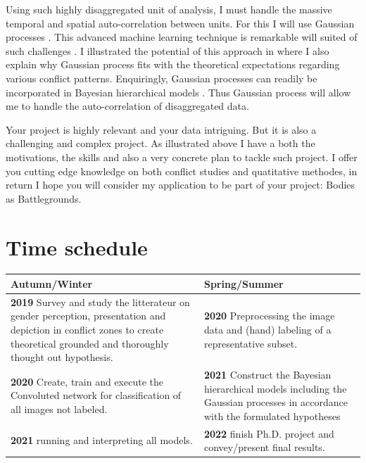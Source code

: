 \documentclass[a4paper]{article}
\begin{document}
Using such highly disaggregated unit of analysis, I must handle the massive temporal and spatial auto-correlation between units. For this I will use Gaussian processes \citep{williams2006gaussian}. This advanced machine learning technique is remarkable will suited of such challenges \citep{Gelman_2013, gelfand2016spatial, Mcelreath_2018, SPECIALE}. I illustrated the potential of this approach in \cite{SPECIALE} where I also explain why Gaussian process fits with the theoretical expectations regarding various conflict patterns\citep[22-27]{SPECIALE}. Enquiringly, Gaussian processes can readily be incorporated in Bayesian hierarchical models \citep[410-419]{Mcelreath_2018}. Thus Gaussian process will allow me to handle the auto-correlation of disaggregated data.\par


Your project is highly relevant and your data intriguing. But it is also a challenging and complex project. As illustrated above I have a both the motivations, the skills and also a very concrete plan to tackle such project. I offer you cutting edge knowledge on both conflict studies and quatitative methodes, in return I hope you will consider my application to be part of your project: Bodies as Battlegrounds.\par



\pagebreak

\section{Time schedule} 

\begin{center}
\begin{tabular}{ m{7.5cm}| m{7.5cm} } 
    \textbf{Autumn/Winter}              & \textbf{Spring/Summer}\\
	\hline
    \textbf{2019} Survey and study the litterateur on gender perception, presentation and depiction in conflict zones to create theoretical grounded and thoroughly thought out hypothesis.
    & \textbf{2020} Preprocessing the image data and (hand) labeling of a representative subset.\\
    
    \hline
    \textbf{2020} Create, train and execute the Convoluted network for classification of all images not labeled.
    & \textbf{2021} Construct the Bayesian hierarchical models including the Gaussian processes in accordance with the formulated hypotheses\\
    
    \hline
    \textbf{2021} running and interpreting all models.
    & \textbf{2022} finish Ph.D. project and convey/present final results.\\	

\end{tabular}
\end{center}
\pagebreak
\end{document}
